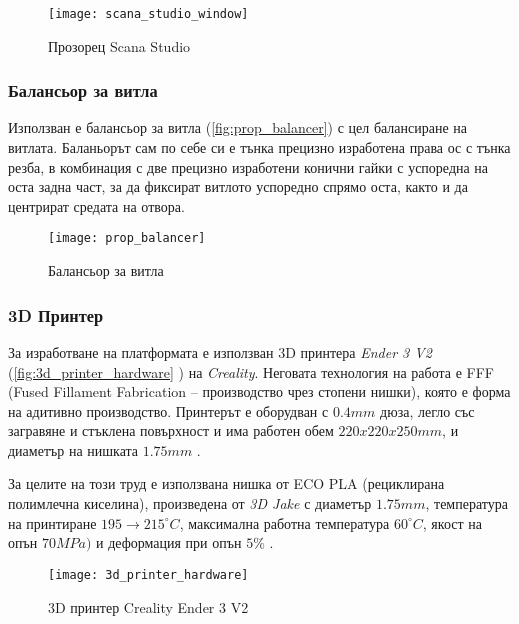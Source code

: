 \begin{figure}[htpb!]
    \centering
    \texttt{[image: scana\_studio\_window]}
    \caption{Прозорец Scana Studio}
    \label{fig:scana_studio_window}
\end{figure}

\FloatBarrier


\subsubsection{Балансьор за витла}
\FloatBarrier


Използван е балансьор за витла (\autoref{fig:prop_balancer}) с цел балансиране на витлата.
Баланьорът сам по себе си е тънка прецизно изработена права ос с тънка резба, в комбинация с две прецизно изработени конични гайки с успоредна на оста задна част,
за да фиксират витлото успоредно спрямо оста, както и да центрират средата на отвора.
 
\begin{figure}[htpb!]
    \centering
    \texttt{[image: prop\_balancer]}
    \caption{Балансьор за витла}
    \label{fig:prop_balancer}
\end{figure}


\subsubsection{3D Принтер}
\FloatBarrier

За изработване на платформата е използван 3D принтера \textit{Ender 3 V2} (\autoref{fig:3d_printer_hardware} ) на \textit{Creality}.
Неговата технология на работа е FFF (Fused Fillament Fabrication -- производство чрез стопени нишки), която е форма на адитивно производство.
Принтерът е оборудван с \(0.4mm\) дюза,
легло със загравяне и стъклена повърхност
и има работен обем \(220x220x250mm\), 
и диаметър на нишката \(1.75mm\) \cite{user_manual_3d_printer}.

За целите на този труд е използвана нишка от ECO PLA (рециклирана полимлечна киселина), произведена от \textit{3D Jake} 
с диаметър \(1.75mm\),
температура на принтиране \(195\to215^{\circ}C\), 
максимална работна температура \(60^{\circ}C\),
якост на опън \(70MPa)\)
и деформация при опън \(5\%\) \cite{datasheet_ecopla}.

\begin{figure}[htpb!]
    \centering
    \texttt{[image: 3d\_printer\_hardware]}
    \caption{3D принтер Creality Ender 3 V2}
    \label{fig:3d_printer_hardware}
\end{figure}

